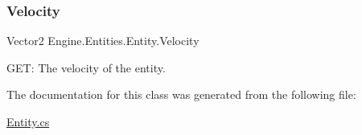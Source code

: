 \subsubsection{\texorpdfstring{Velocity}{Velocity}}
{\footnotesize\ttfamily Vector2 Engine.\+Entities.\+Entity.\+Velocity\hspace{0.3cm}{\ttfamily [get]}}



G\+ET\+: The velocity of the entity. 



The documentation for this class was generated from the following file\+:\begin{DoxyCompactItemize}
\item 
\hyperlink{a00017}{Entity.\+cs}\end{DoxyCompactItemize}
